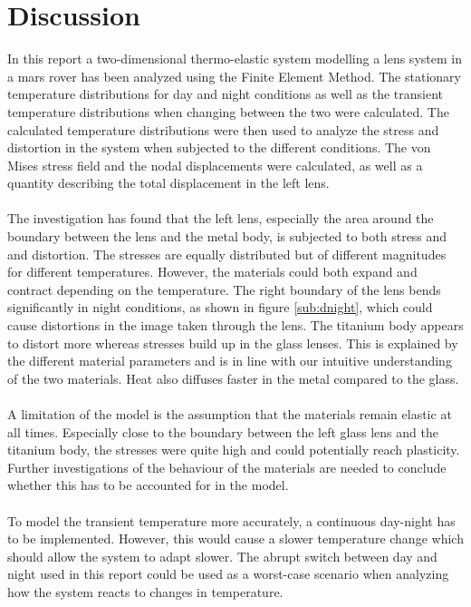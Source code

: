 \documentclass[a4paper,11pt]{article}
\begin{document}
\section{Discussion}

In this report a two-dimensional thermo-elastic system modelling a lens system in a mars rover has been analyzed using the Finite Element Method. The stationary temperature distributions for day and night conditions as well as the transient temperature distributions when changing between the two were calculated. The calculated temperature distributions were then used to analyze the stress and distortion in the system when subjected to the different conditions. The von Mises stress field and the nodal displacements were calculated, as well as a quantity describing the total displacement in the left lens.
\\ \\
The investigation has found that the left lens, especially the area around the boundary between the lens and the metal body, is subjected to both stress and and distortion. The stresses are equally distributed but of different magnitudes for different temperatures. However, the materials could both expand and contract depending on the temperature. The right boundary of the lens bends significantly in night conditions, as shown in figure \ref{sub:dnight}, which could cause distortions in the image taken through the lens. The titanium body appears to distort more whereas stresses build up in the glass lenses. This is explained by the different material parameters and is in line with our intuitive understanding of the two materials. Heat also diffuses faster in the metal compared to the glass.
\\ \\
A limitation of the model is the assumption that the materials remain elastic at all times. Especially close to the boundary between the left glass lens and the titanium body, the stresses were quite high and could potentially reach plasticity. Further investigations of the behaviour of the materials are needed to conclude whether this has to be accounted for in the model. 
\\ \\
To model the transient temperature more accurately, a continuous day-night has to be implemented. However, this would cause a slower temperature change which should allow the system to adapt slower. The abrupt switch between day and night used in this report could be used as a worst-case scenario when analyzing how the system reacts to changes in temperature.
\\ \\
\end{document}
